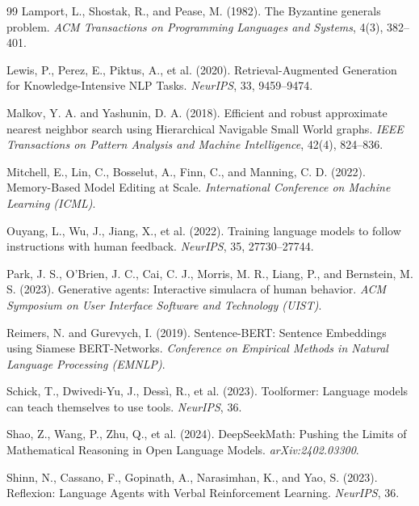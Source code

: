 \begin{thebibliography}{99}
Lamport, L., Shostak, R., and Pease, M. (1982).
\newblock The Byzantine generals problem.
\newblock \emph{ACM Transactions on Programming Languages and Systems}, 4(3), 382--401.

Lewis, P., Perez, E., Piktus, A., et al. (2020).
\newblock Retrieval-Augmented Generation for Knowledge-Intensive NLP Tasks.
\newblock \emph{NeurIPS}, 33, 9459--9474.

Malkov, Y. A. and Yashunin, D. A. (2018).
\newblock Efficient and robust approximate nearest neighbor search using
  Hierarchical Navigable Small World graphs.
\newblock \emph{IEEE Transactions on Pattern Analysis and Machine Intelligence},
  42(4), 824--836.

Mitchell, E., Lin, C., Bosselut, A., Finn, C., and Manning, C. D. (2022).
\newblock Memory-Based Model Editing at Scale.
\newblock \emph{International Conference on Machine Learning (ICML)}.

Ouyang, L., Wu, J., Jiang, X., et al. (2022).
\newblock Training language models to follow instructions with human feedback.
\newblock \emph{NeurIPS}, 35, 27730--27744.

Park, J. S., O'Brien, J. C., Cai, C. J., Morris, M. R., Liang, P., and Bernstein, M. S. (2023).
\newblock Generative agents: Interactive simulacra of human behavior.
\newblock \emph{ACM Symposium on User Interface Software and Technology (UIST)}.

Reimers, N. and Gurevych, I. (2019).
\newblock Sentence-BERT: Sentence Embeddings using Siamese BERT-Networks.
\newblock \emph{Conference on Empirical Methods in Natural Language Processing (EMNLP)}.

Schick, T., Dwivedi-Yu, J., Dess{\`{i}}, R., et al. (2023).
\newblock Toolformer: Language models can teach themselves to use tools.
\newblock \emph{NeurIPS}, 36.

Shao, Z., Wang, P., Zhu, Q., et al. (2024).
\newblock DeepSeekMath: Pushing the Limits of Mathematical Reasoning in Open
  Language Models.
\newblock \emph{arXiv:2402.03300}.

Shinn, N., Cassano, F., Gopinath, A., Narasimhan, K., and Yao, S. (2023).
\newblock Reflexion: Language Agents with Verbal Reinforcement Learning.
\newblock \emph{NeurIPS}, 36.


\end{thebibliography}
